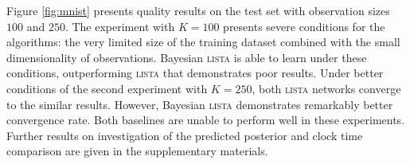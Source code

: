 \documentclass{article}
\begin{document}
  Figure \ref{fig:mnist} presents quality results on the test set with observation sizes $100$ and $250$. The experiment with $K=100$ presents severe conditions for the algorithms: the very limited size of the training dataset combined with the small dimensionality of observations. Bayesian \textsc{lista} is able to learn under these conditions, outperforming \textsc{lista} that demonstrates poor results. Under better conditions of the second experiment with $K=250$, both \textsc{lista} networks converge to the similar results. However, Bayesian \textsc{lista} demonstrates remarkably better convergence rate. Both baselines are unable to perform well in these experiments. Further results on investigation of the predicted posterior and clock time comparison are given in the supplementary materials.
  
  \begin{figure}[t!]
  \centering
  \\[-13pt]

\end{figure}
\end{document}
